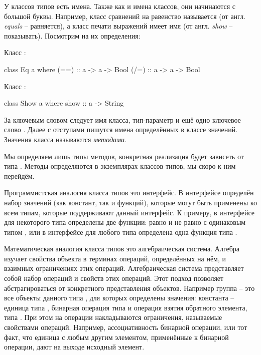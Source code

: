 У классов типов есть имена. Также как и имена классов, 
они начинаются с большой буквы. Например, класс сравнений 
на равенство называется  
 (от англ. \emph{equals} -- равняется),
а класс печати выражений имеет имя  (от англ. \emph{show} 
-- показывать). Посмотрим на их определения:

Класс  :

\begin{code}
class Eq a where
    (==) :: a -> a -> Bool
    (/=) :: a -> a -> Bool
\end{code}

Класс   :

\begin{code}
class Show a where
    show :: a -> String
\end{code}

За ключевым словом   следует имя класса, тип-параметр
и ещё одно ключевое слово . Далее с отступами пишутся
имена определённых в классе значений. Значения класса называются
 \emph{методами}.

Мы определяем лишь типы методов, конкретная реализация будет
зависеть от типа . Методы определяются в экземплярах
классов типов, мы скоро к ним перейдём.

Программистская аналогия
класса типов это интерфейс. В интерфейсе определён набор
значений (как констант, так и функций), которые могут быть применены 
ко всем типам, которые поддерживают данный интерфейс.
К примеру, в интерфейсе  для некоторого
типа  определены две функции: равно \In{(==)} и 
не равно \In{(/=)} с одинаковым
типом , или в интерфейсе  для
любого типа  определена одна функция  типа .

Математическая аналогия 
класса типов это алгебраическая система. Алгебра 
изучает свойства объекта в терминах операций, определённых на нём,
и взаимных ограничениях этих операций. Алгебраическая система представляет
собой набор операций и свойств этих операций. Этот подход позволяет
абстрагироваться от конкретного представления объектов. Например группа -- 
это все объекты данного типа ,  для которых определены
значения: константа -- единица типа , бинарная операция
типа  и операция взятия обратного элемента,
типа . При этом на операции накладываются 
ограничения, называемые свойствами операций. Например, ассоциативность
бинарной операции, или тот факт, что единица с любым другим
элементом, применённые к бинарной операции, дают на выходе
исходный элемент.

